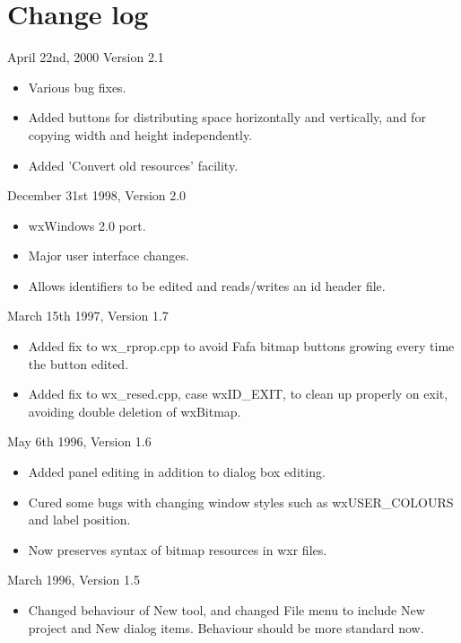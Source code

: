 \chapter{Change log}\label{changes}
%
\setfooter{\thepage}{}{}{}{}{\thepage}%

April 22nd, 2000 Version 2.1

\begin{itemize}\itemsep=0pt
\item Various bug fixes.
\item Added buttons for distributing space horizontally and vertically, and
for copying width and height independently.
\item Added 'Convert old resources' facility.
\end{itemize}

December 31st 1998, Version 2.0

\begin{itemize}\itemsep=0pt
\item wxWindows 2.0 port.
\item Major user interface changes.
\item Allows identifiers to be edited and reads/writes an id header file.
\end{itemize}

March 15th 1997, Version 1.7

\begin{itemize}\itemsep=0pt
\item Added fix to wx\_rprop.cpp to avoid Fafa bitmap buttons growing every time the
button edited.
\item Added fix to wx\_resed.cpp, case wxID\_EXIT, to clean up properly on exit, avoiding double deletion of wxBitmap.
\end{itemize}

May 6th 1996, Version 1.6

\begin{itemize}\itemsep=0pt
\item Added panel editing in addition to dialog box editing.
\item Cured some bugs with changing window styles such as wxUSER\_COLOURS and label position.
\item Now preserves syntax of bitmap resources in wxr files.
\end{itemize}

March 1996, Version 1.5

\begin{itemize}\itemsep=0pt
\item Changed behaviour of New tool, and changed File menu to include New project and New dialog items.
Behaviour should be more standard now.
\end{itemize}

